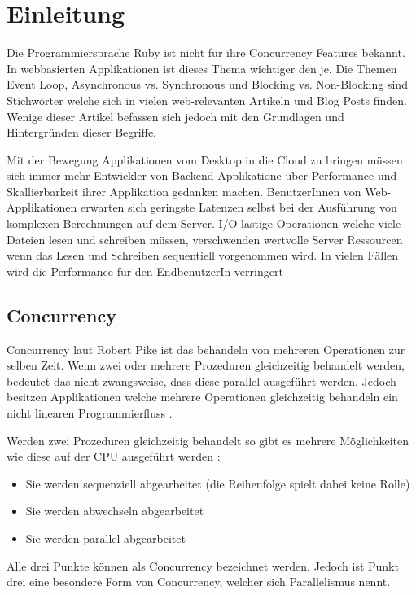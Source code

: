 \section{Einleitung}
\label{section:Einleitung}

Die Programmiersprache Ruby ist nicht für ihre Concurrency Features bekannt. In webbasierten Applikationen ist dieses Thema wichtiger den je. Die Themen Event Loop, Asynchronous vs. Synchronous und Blocking vs. Non-Blocking sind Stichwörter welche sich in vielen web-relevanten Artikeln und Blog Posts finden. Wenige dieser Artikel befassen sich jedoch mit den Grundlagen und Hintergründen dieser Begriffe. 

Mit der Bewegung Applikationen vom Desktop in die Cloud zu bringen müssen sich immer mehr Entwickler von Backend Applikatione über Performance und Skallierbarkeit ihrer Applikation gedanken machen. BenutzerInnen von Web-Applikationen erwarten sich geringste Latenzen selbst bei der Ausführung von komplexen Berechnungen auf dem Server. I/O lastige Operationen welche viele Dateien lesen und schreiben müssen, verschwenden wertvolle Server Ressourcen wenn das Lesen und Schreiben sequentiell vorgenommen wird. In vielen Fällen wird  die Performance für den EndbenutzerIn verringert

\subsection{Concurrency}
\label{section:concurrency}

Concurrency laut Robert Pike ist das behandeln von mehreren Operationen zur selben Zeit. Wenn zwei oder mehrere Prozeduren gleichzeitig behandelt werden, bedeutet das nicht zwangsweise, dass diese parallel ausgeführt werden. Jedoch besitzen Applikationen welche mehrere Operationen gleichzeitig behandeln ein nicht linearen Programmierfluss \cite[]{Pik2013}.

Werden zwei Prozeduren gleichzeitig behandelt so gibt es mehrere Möglichkeiten wie diese auf der CPU ausgeführt werden \cite[p. 14]{Erb2012}:

\begin{itemize}
  \item Sie werden sequenziell abgearbeitet (die Reihenfolge spielt dabei keine Rolle)
  \item Sie werden abwechseln abgearbeitet
  \item Sie werden parallel abgearbeitet
\end{itemize}

Alle drei Punkte können als Concurrency bezeichnet werden. Jedoch ist Punkt drei eine besondere Form von Concurrency, welcher sich Parallelismus nennt. 

